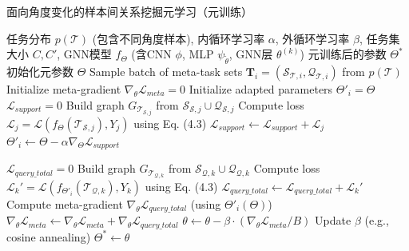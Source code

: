 \begin{algorithm}[htbp]
\caption{面向角度变化的样本间关系挖掘元学习（元训练）}
\label{alg:meta_training_angle}
\begin{algorithmic}[1]
    \REQUIRE 任务分布 $p(\mathcal{T})$ (包含不同角度样本), 内循环学习率 $\alpha$, 外循环学习率 $\beta$, 任务集大小 $C, C'$, GNN模型 $f_\Theta$ (含CNN $\phi$, MLP $\psi_{\tilde{\theta}}$, GNN层 $\theta^{(k)}$)
    \ENSURE 元训练后的参数 $\Theta^*$
    \STATE 初始化元参数 $\Theta$
        \STATE Sample batch of meta-task sets $\mathbf{T}_i = (\mathcal{S}_{\mathcal{T},i}, \mathcal{Q}_{\mathcal{T},i})$ from $p(\mathcal{T})$
        \STATE Initialize meta-gradient $\nabla_\theta \mathcal{L}_{meta} = 0$
            \STATE Initialize adapted parameters $\Theta'_i = \Theta$
            \STATE $\mathcal{L}_{support} = 0$
               \STATE Build graph $G_{\mathcal{T}_{\mathcal{S},j}}$ from $\mathcal{S}_{\mathcal{S},j} \cup \mathcal{Q}_{\mathcal{S},j}$
               \STATE Compute loss $\mathcal{L}_j = \mathcal{L}(f_{\Theta}(\mathcal{T}_{\mathcal{S},j}), Y_j)$ using Eq. (4.3)
               \STATE $\mathcal{L}_{support} \leftarrow \mathcal{L}_{support} + \mathcal{L}_j$
            \ENDFOR
            \STATE $\Theta'_i \leftarrow \Theta - \alpha \nabla_{\Theta} \mathcal{L}_{support}$ %

            \STATE $\mathcal{L}_{query\_total} = 0$
               \STATE Build graph $G_{\mathcal{T}_{\mathcal{Q},k}}$ from $\mathcal{S}_{\mathcal{Q},k} \cup \mathcal{Q}_{\mathcal{Q},k}$
               \STATE Compute loss $\mathcal{L}_k' = \mathcal{L}(f_{\Theta'_i}(\mathcal{T}_{\mathcal{Q},k}), Y_k)$ using Eq. (4.3)
               \STATE $\mathcal{L}_{query\_total} \leftarrow \mathcal{L}_{query\_total} + \mathcal{L}_k'$
            \ENDFOR
            \STATE Compute meta-gradient $\nabla_\theta \mathcal{L}_{query\_total}$ (using $\Theta'_i(\Theta)$)
            \STATE $\nabla_\theta \mathcal{L}_{meta} \leftarrow \nabla_\theta \mathcal{L}_{meta} + \nabla_\theta \mathcal{L}_{query\_total}$
        \ENDFOR
        \STATE $\theta \leftarrow \theta - \beta \cdot (\nabla_\theta \mathcal{L}_{meta} / B)$ %
        \STATE Update $\beta$ (e.g., cosine annealing)
    \ENDWHILE
    \STATE $\Theta^* \leftarrow \theta$
\end{algorithmic}
\end{algorithm}

